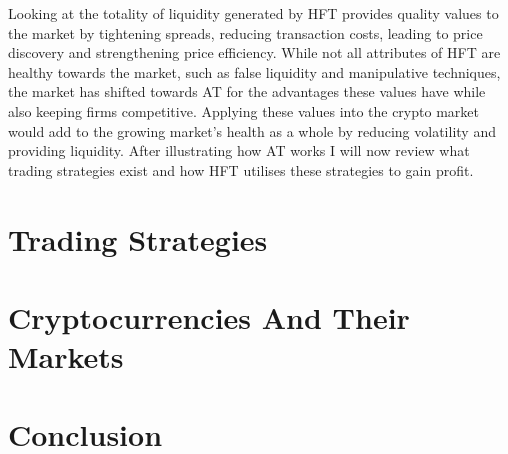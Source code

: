 Looking at the totality of liquidity generated by HFT provides quality values to the market by tightening spreads, reducing transaction costs, leading to price discovery and strengthening price efficiency. While not all attributes of HFT are healthy towards the market, such as false liquidity and manipulative techniques, the market has shifted towards AT for the advantages these values have while also keeping firms competitive. Applying these values into the crypto market would add to the growing market's health as a whole by reducing volatility and providing liquidity. After illustrating how AT works I will now review what trading strategies exist and how HFT utilises these strategies to gain profit.




\section{Trading Strategies}
\label{sec:related:tradingStrategies}


\section{Cryptocurrencies And Their Markets}
\label{sec:related:cryptoAndTheirMarkets}


\section{Conclusion}
\label{sec:related:conclusion}

